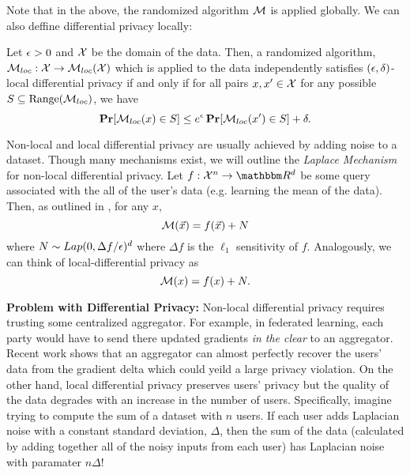 \documentclass[11pt]{article}
\begin{document}
Note that in the above, the randomized algorithm $\mathcal{M}$ is applied globally.
We can also deffine differential privacy locally:

\begin{definition}
	Let $\epsilon > 0$ and $\mathcal{X}$ be the domain of the data.
	Then, a randomized algorithm, $\mathcal{M}_{loc} : \mathcal{X} \rightarrow \mathcal{M}_{loc}(\mathcal{X})$ which is applied to the data independently satisfies $(\epsilon, \delta)$-local differential privacy if and only if for all pairs $x, x' \in \mathcal{X}$
	for any possible $S \subseteq \text{Range}(\mathcal{M}_{loc})$, we have
	\[
		\operatorname*{\mathbf{Pr}}[\mathcal{M}_{loc}(x) \in S] \leq e^\epsilon \operatorname*{\mathbf{Pr}}[\mathcal{M}_{loc}(x') \in S] + \delta.
	\]
\end{definition}

Non-local and local differential privacy are usually achieved by adding noise to a dataset.
Though many mechanisms exist, we will outline the \emph{Laplace Mechanism} for non-local differential privacy.
Let $f: \mathcal{X}^n \rightarrow \R^d$ be some query associated with the all of the user's data (e.g. learning the mean of the data).
Then, as outlined in \cite{Bassily_2015}, for any $x$,
\[
	\mathcal{M}(\vec{x}) = f(\vec{x}) + N
\]
where $N \sim Lap(0, \Delta f/ \epsilon)^{d}$ where $\Delta f$ is the $\ell_1$ sensitivity of $f$.
Analogously, we can think of local-differential privacy as \[
	\mathcal{M}(x) = f(x) + N.
\]

\textbf{Problem with Differential Privacy:} Non-local differential privacy requires trusting some centralized aggregator.
For example, in federated learning, each party would have to send there updated gradients \emph{in the clear} to an aggregator.
Recent work \cite{gupta2022recoveringprivatetextfederated} shows that an aggregator can almost perfectly recover the users' data from the gradient delta which could yeild a large privacy violation.
On the other hand, local differential privacy preserves users' privacy but the quality of the data degrades with an increase in the number of users.
Specifically, imagine trying to compute the sum of a dataset with $n$ users.
If each user adds Laplacian noise with a constant standard deviation, $\Delta$, then the sum of the data (calculated by adding together all of the noisy inputs from each user) has Laplacian noise with paramater $n \Delta$!
\end{document}
